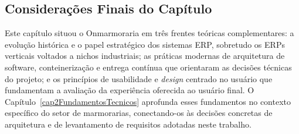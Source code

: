 \subsection*{Considerações Finais do Capítulo}

Este capítulo situou o Onmarmoraria em três frentes teóricas complementares: a evolução histórica e o papel estratégico dos sistemas ERP, sobretudo os ERPs verticais voltados a nichos industriais; as práticas modernas de arquitetura de software, conteinerização e entrega contínua que orientaram as decisões técnicas do projeto; e os princípios de usabilidade e \textit{design} centrado no usuário que fundamentam a avaliação da experiência oferecida ao usuário final. O Capítulo~\ref{cap2FundamentosTecnicos} aprofunda esses fundamentos no contexto específico do setor de marmorarias, conectando-os às decisões concretas de arquitetura e de levantamento de requisitos adotadas neste trabalho.
